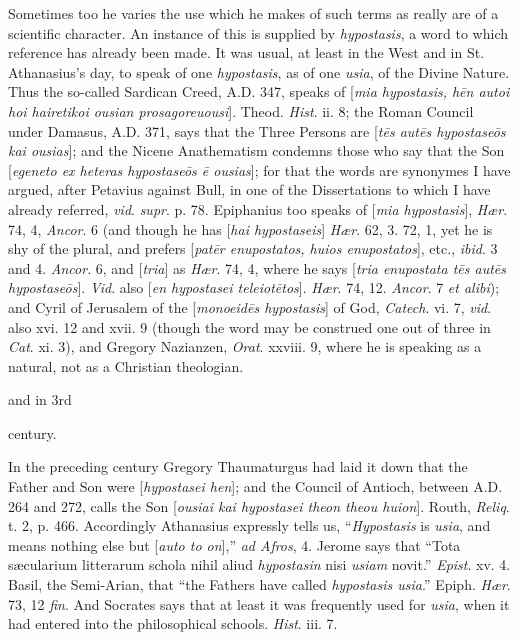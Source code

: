 Sometimes too he varies the use which he
makes of such terms as really are of a scientific character.
An instance of this is supplied by \emph{hypostasis}, a word
to which reference has already been made. It was usual, at
least in the West and in St. Athanasius's day, to speak of one
\emph{hypostasis}, as of one \emph{usia}, of the Divine
Nature. Thus the so-called Sardican Creed, A.D. 347, speaks of
[\emph{mia hypostasis, h\={e}n autoi hoi hairetikoi ousian
prosagoreuousi}]. Theod. \emph{Hist}. ii. 8; the Roman
Council under Damasus, A.D.
371, says that the Three Persons are [\emph{t\={e}s aut\={e}s
hypostase\={o}s kai ousias}]; and the Nicene Anathematism
condemns those who say that the Son [\emph{egeneto ex heteras
hypostase\={o}s \={e} ousias}]; for that the words
are synonymes I have argued, after Petavius against Bull, in
one of the Dissertations to which I have already referred, \emph{vid}.
\emph{supr}. p. 78. Epiphanius too speaks of [\emph{mia
hypostasis}], \emph{Hær}. 74, 4, \emph{Ancor}. 6 (and
though he has [\emph{hai hypostaseis}] \emph{Hær}. 62, 3. 72,
1, yet he is shy of the plural, and prefers [\emph{pat\={e}r
enupostatos, huios enupostatos}], etc., \emph{ibid}. 3 and
4. \emph{Ancor}. 6, and [\emph{tria}] as \emph{Hær}. 74, 4,
where he says [\emph{tria enupostata t\={e}s aut\={e}s
hypostase\={o}s}]. \emph{Vid}. also [\emph{en hypostasei
teleiot\={e}tos}]. \emph{Hær}. 74, 12. \emph{Ancor}. 7 \emph{et
alibi}); and Cyril of Jerusalem of the [\emph{monoeid\={e}s
hypostasis}] of God, \emph{Catech}. vi. 7, \emph{vid}. also
xvi. 12 and xvii. 9 (though the word may be construed one out
of three in \emph{Cat}. xi. 3), and Gregory Nazianzen, \emph{Orat}.
xxviii. 9, where he is speaking as a natural, not as a
Christian theologian.

and in 3rd

century.

In the preceding century Gregory
Thaumaturgus had laid it down that the Father and Son were [\emph{hypostasei
hen}]; and the Council of Antioch, between A.D. 264
and 272, calls the Son [\emph{ousiai kai hypostasei theon theou
huion}]. Routh, \emph{Reliq}. t. 2, p. 466. Accordingly
Athanasius expressly tells us, ``\emph{Hypostasis} is \emph{usia},
and means nothing else but [\emph{auto to on}],'' \emph{ad Afros},
4. Jerome says that ``Tota sæcularium litterarum schola nihil
aliud \emph{hypostasin} nisi \emph{usiam} novit.'' \emph{Epist}.
xv. 4. Basil, the Semi-Arian, that ``the Fathers have called \emph{hypostasis
usia}.'' Epiph. \emph{Hær}. 73, 12 \emph{fin}. And Socrates
says that at least it was frequently used for \emph{usia},
when it had entered into the philosophical schools. \emph{Hist}.
iii. 7.


